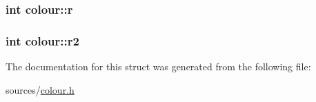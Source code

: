 \hypertarget{structcolour_af6ffd9e61ca4986697eae2c1b538cf8c}{
\subsubsection[{r}]{\setlength{\rightskip}{0pt plus 5cm}int colour\-::r}}\label{structcolour_af6ffd9e61ca4986697eae2c1b538cf8c}
\hypertarget{structcolour_a4824403252ea1a30ea97cbc079bdd6d4}{
\subsubsection[{r2}]{\setlength{\rightskip}{0pt plus 5cm}int colour\-::r2}}\label{structcolour_a4824403252ea1a30ea97cbc079bdd6d4}


The documentation for this struct was generated from the following file\-:\begin{DoxyCompactItemize}
\item 
sources/\hyperlink{colour_8h}{colour.\-h}\end{DoxyCompactItemize}
